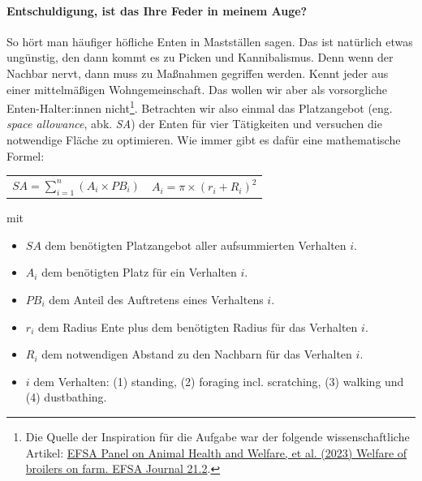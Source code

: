 \documentclass[a4paper, 9pt]{scrartcl}\usepackage[]{graphicx}\usepackage[]{xcolor}
\begin{document}
\paragraph{Entschuldigung,  ist das Ihre Feder in meinem Auge?}



So h{\"o}rt man h{\"a}ufiger h{\"o}fliche Enten in Mastst{\"a}llen sagen. Das
ist nat{\"u}rlich etwas ung{\"u}nstig, den dann kommt es zu Picken und
Kannibalismus. Denn wenn der Nachbar nervt, dann muss zu Ma{\ss}nahmen
gegriffen werden. Kennt jeder aus einer mittelm{\"a}{\ss}igen Wohngemeinschaft. Das
wollen wir aber als vorsorgliche Enten-Halter:innen
nicht\footnote{Die Quelle der Inspiration f{\"u}r die Aufgabe war der folgende
  wissenschaftliche Artikel:
  \href{https://www.efsa.europa.eu/en/efsajournal/pub/7788}{EFSA Panel on
    Animal Health and Welfare, et al. (2023) Welfare of broilers on
    farm. EFSA Journal 21.2}.}. Betrachten wir also einmal das Platzangebot
(eng. \textit{space allowance}, abk. \textit{SA}) der Enten
f{\"u}r vier T{\"a}tigkeiten und versuchen die notwendige Fl{\"a}che zu optimieren. Wie
immer gibt es daf{\"u}r eine mathematische Formel:


\begin{center}
  \begin{tabular}{cc}
    $SA = \sum^n_{i = 1} (A_i \times PB_i)$ & $A_i = \pi \times (r_i + R_i)^2$\\
  \end{tabular}
\end{center}

\vspace{-2Ex}

mit

\begin{itemize}[noitemsep]
\item $SA$ dem ben{\"o}tigten Platzangebot aller aufsummierten Verhalten $i$.
\item $A_i$ dem ben{\"o}tigten Platz f{\"u}r ein Verhalten $i$. 
\item $PB_i$ dem Anteil des Auftretens eines Verhaltens $i$.
\item $r_i$ dem Radius Ente plus dem ben{\"o}tigten Radius f{\"u}r das Verhalten $i$.
\item $R_i$ dem notwendigen Abstand zu den Nachbarn f{\"u}r das Verhalten $i$.    
\item $i$ dem Verhalten: (1) standing, (2) foraging incl. scratching, (3)
  walking und (4) dustbathing.
\end{itemize}
\end{document}
